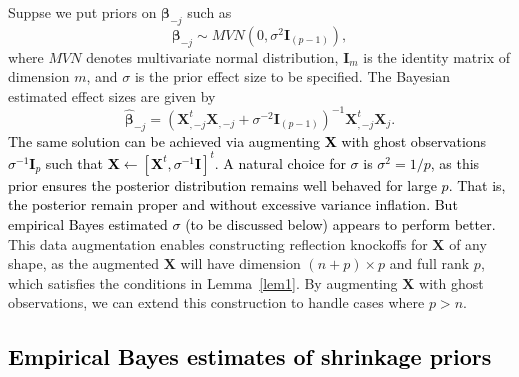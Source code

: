 \documentclass[12pt,Times]{article}
\def\tcb{\textcolor{black}}
\def\X{{\mathbf{X}}}
\def\mbeta{{\mathbf{\beta}}}
\def\I{{\mathbf{I}}}
\begin{document}
Suppse we put priors on $\mbeta_{-j}$ such as
\begin{equation} \label{prior}
\mbeta_{-j} \sim MVN(0, \sigma^2 \I_{(p-1)}), 
\end{equation} 
where $MVN$ denotes multivariate normal distribution, $\I_m$ is the identity matrix of dimension $m$, and $\sigma$ is the prior effect size to be specified. The Bayesian estimated effect sizes are given by 
\begin{equation} \label{betahat}
\hat\mbeta_{-j} = \left(\X_{,-j}^t \X_{,-j} + \sigma^{-2} \I_{(p-1)}\right)^{-1}  \X_{,-j}^t \X_j.
\end{equation} 
\tcb{The same solution can be achieved via augmenting $\X$ with ghost observations $\sigma^{-1} \I_p$ such that $\X \leftarrow [\X^t, \sigma^{-1} \I]^t$.} 
\tcb{A natural choice for $\sigma$ is $\sigma^2 =1/p$,  as this prior ensures the posterior distribution remains well behaved for large $p$. That is, the posterior remain proper and without excessive variance inflation. But empirical Bayes estimated $\sigma$ (to be discussed below) appears to perform better.}
This data augmentation enables constructing reflection knockoffs for $\X$ of any shape, as the augmented $\X$ will have dimension $(n+p) \times p$ and full rank $p$,  which satisfies the conditions in Lemma~\ref{lem1}.    
By augmenting $\X$ with ghost observations, we can extend this construction to handle  cases where $p > n$.   



\subsection{\tcb{Empirical Bayes estimates of shrinkage priors}}
\end{document}
